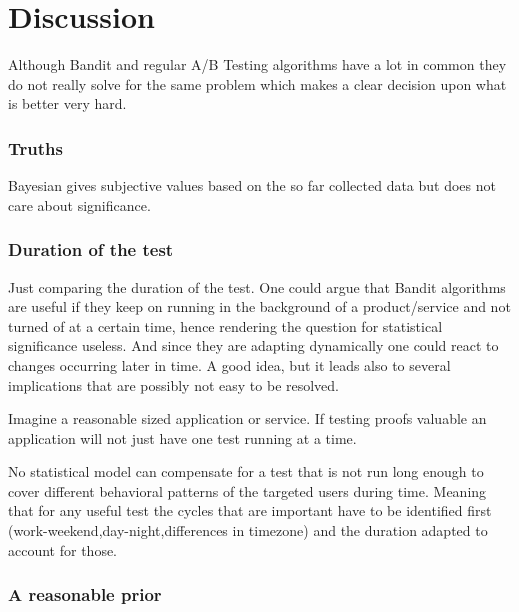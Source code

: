 \documentclass[main.tex]{subfiles}
\begin{document}
\chapter{Discussion}
Although Bandit and regular A/B Testing algorithms have a lot in common they do not really solve for the same problem which makes a clear decision upon what is better very hard.
\subsection{Truths}
Bayesian gives subjective values based on the so far collected data but does not care about significance.

\subsection{Duration of the test}
Just comparing the duration of the test. One could argue that Bandit algorithms are useful if they keep on running in the background of a product/service and not turned of at a certain time, hence rendering the question for statistical significance useless. And since they are adapting dynamically one could react to changes occurring later in time. A good idea, but it leads also to several implications that are possibly not easy to be resolved. 

Imagine a reasonable sized application or service. If testing proofs valuable an application will not just have one test running at a time. 

No statistical model can compensate for a test that is not run long enough to cover different behavioral patterns of the targeted users during time. Meaning that for any useful test the cycles that are important have to be identified first (work-weekend,day-night,differences in timezone) and the duration adapted to account for those.

\subsection{A reasonable prior}
\end{document}
